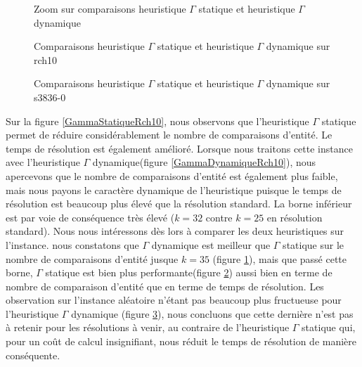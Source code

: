 \begin{figure}
\centering
	
\caption{Zoom sur comparaisons heuristique $\Gamma$ statique et heuristique $\Gamma$ dynamique}
\label{compGammaZoom}
\end{figure}

\begin{figure}
\centering
	\begin{minipage}[c]{0.49\linewidth}
	\centering
	
	\end{minipage}
	\begin{minipage}[c]{0.49\linewidth}
	\centering
	
	\end{minipage}
\caption{Comparaisons heuristique $\Gamma$ statique et heuristique $\Gamma$ dynamique sur rch10}
\label{compGamma}
\end{figure}

\begin{figure}
\centering
	\begin{minipage}[c]{0.49\linewidth}
	\centering
	
	\end{minipage}
	\begin{minipage}[c]{0.49\linewidth}
	\centering
	
	\end{minipage}
\caption{Comparaisons heuristique $\Gamma$ statique et heuristique $\Gamma$ dynamique sur s3836-0}
\label{compGammaS3836}
\end{figure}

Sur la figure \ref{GammaStatiqueRch10}, nous observons que l'heuristique $\Gamma$ statique permet de réduire considérablement le nombre de comparaisons d'entité. Le temps de résolution est également amélioré. Lorsque nous traitons cette instance avec l'heuristique $\Gamma$ dynamique(figure \ref{GammaDynamiqueRch10}), nous apercevons que le nombre de comparaisons d'entité est également plus faible, mais nous payons le caractère dynamique de l'heuristique puisque le temps de résolution est beaucoup plus élevé que la résolution standard. La borne inférieur est par voie de conséquence très élevé ($k=32$ contre $k=25$ en résolution standard). Nous nous intéressons dès lors à comparer les deux heuristiques sur l'instance. nous constatons que $\Gamma$ dynamique est meilleur que $\Gamma$ statique sur le nombre de comparaisons d'entité jusque $k=35$ (figure \ref{compGammaZoom}), mais que passé cette borne, $\Gamma$ statique est bien plus performante(figure \ref{compGamma}) aussi bien en terme de nombre de comparaison d'entité que en terme de temps de résolution. Les observation sur l'instance aléatoire n'étant pas beaucoup plus fructueuse pour l'heuristique $\Gamma$ dynamique (figure \ref{compGammaS3836}), nous concluons que cette dernière n'est pas à retenir pour les résolutions à venir, au contraire de l'heuristique $\Gamma$ statique qui, pour un coût de calcul insignifiant, nous réduit le temps de résolution de manière conséquente.

